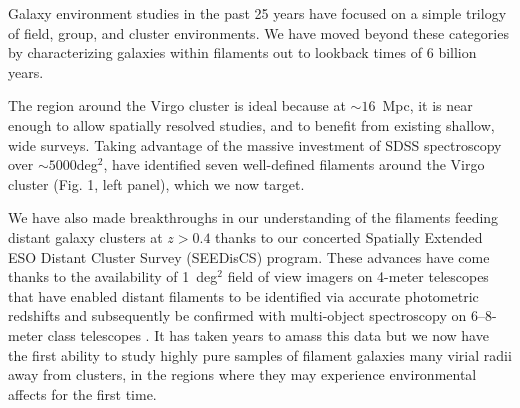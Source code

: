 \documentclass[11pt]{article}
\begin{document}
  Galaxy environment studies in the past 25 years have focused on a simple trilogy of field, group, and cluster environments.  We have moved beyond these categories by characterizing galaxies within filaments out to lookback times of 6 billion years.

The region around the Virgo cluster is ideal because at $\sim 16$~Mpc,  it is near enough to allow spatially resolved studies, and to benefit from existing shallow, wide surveys. Taking advantage of the massive investment of SDSS spectroscopy over $\sim 5000$deg$^2$, \citet{Kim16} have identified seven well-defined filaments around the Virgo cluster (Fig. 1, left panel), which we now target.

We have also made breakthroughs in our understanding of the filaments feeding distant galaxy clusters at $z>0.4$ thanks to our concerted Spatially Extended ESO Distant Cluster Survey (SEEDisCS) program.  These advances have come thanks to the availability of 1~deg$^{2}$ field of view imagers on 4-meter telescopes that have enabled distant filaments to be identified via accurate photometric redshifts and subsequently be confirmed with multi-object spectroscopy on 6--8-meter class telescopes \citep[Fig. 1, right panel;][]{Rerat17}.  It has taken years to amass this data but we now have the first ability to study highly pure samples of filament galaxies many virial radii away from clusters, in the regions where they may experience environmental affects for the first time.
\end{document}
